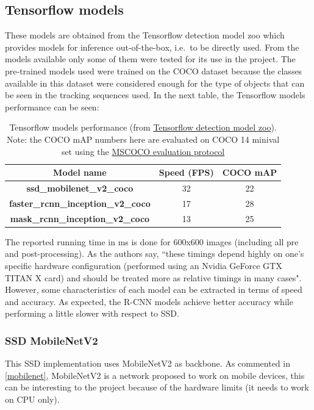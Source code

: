 \subsection{Tensorflow models}
These models are obtained from the Tensorflow detection model zoo which provides models for inference out-of-the-box, i.e.\ to be directly used. From the models available only some of them were tested for its use in the project. The pre-trained models used were trained on the COCO dataset because the classes available in this dataset were considered enough for the type of objects that can be seen in the tracking sequences used. In the next table, the Tensorflow models performance can be seen:
\begin{table}[H]
\begin{center}
\begin{tabular}{|c|c|c|}
\hline
Model name                                 & Speed (FPS) & COCO mAP \\ \hline
\textbf{ssd\_mobilenet\_v2\_coco}          & 32         & 22       \\ \hline
\textbf{faster\_rcnn\_inception\_v2\_coco} & 17         & 28       \\ \hline
\textbf{mask\_rcnn\_inception\_v2\_coco}   & 13         & 25       \\ \hline
\end{tabular}
\end{center}
\caption{Tensorflow models performance (from \href{https://github.com/tensorflow/models/blob/master/research/object_detection/g3doc/detection_model_zoo.md#coco-trained-models}{Tensorflow detection model zoo}). Note: the COCO mAP numbers here are evaluated on COCO 14 minival set using the \href{http://cocodataset.org/#detection-eval}{MSCOCO evaluation protocol}}
\end{table}
The reported running time in ms is done for 600x600 images (including all pre and post-processing). As the authors say, ``these timings depend highly on one's specific hardware configuration (performed using an Nvidia GeForce GTX TITAN X card) and should be treated more as relative timings in many cases". However, some characteristics of each model can be extracted in terms of speed and accuracy. As expected, the R-CNN models achieve better accuracy while performing a little slower with respect to SSD.

\subsubsection{SSD MobileNetV2}
This SSD implementation uses MobileNetV2 as backbone. As commented in \ref{mobilenet}, MobileNetV2 is a network proposed to work on mobile devices, this can be interesting to the project because of the hardware limits (it needs to work on CPU only).
